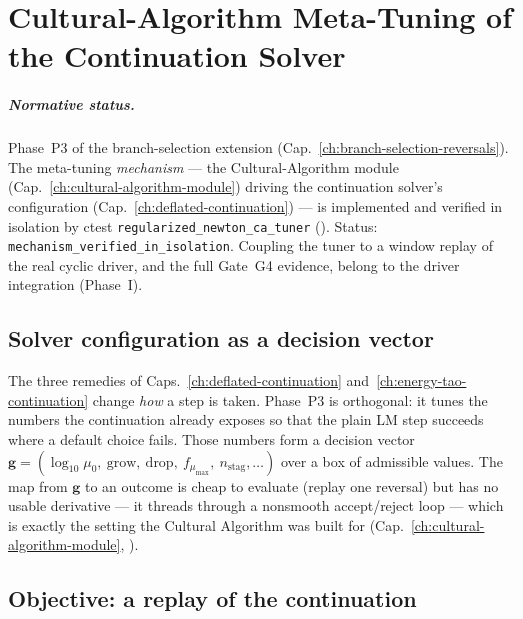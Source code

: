 
\chapter{Cultural-Algorithm Meta-Tuning of the Continuation Solver}
\label{ch:ca-tuner-solver}

\paragraph{Normative status.}
Phase~P3 of the branch-selection extension
(Cap.~\ref{ch:branch-selection-reversals}). The meta-tuning \emph{mechanism}
--- the Cultural-Algorithm module (Cap.~\ref{ch:cultural-algorithm-module})
driving the continuation solver's configuration
(Cap.~\ref{ch:deflated-continuation}) --- is implemented and verified in
isolation by ctest \texttt{regularized\_newton\_ca\_tuner}
(). Status:
\texttt{mechanism\_verified\_in\_isolation}. Coupling the tuner to a
window replay of the real cyclic driver, and the full Gate~G4 evidence,
belong to the driver integration (Phase~I).

\section{Solver configuration as a decision vector}

The three remedies of Caps.~\ref{ch:deflated-continuation}
and~\ref{ch:energy-tao-continuation} change \emph{how} a step is taken.
Phase~P3 is orthogonal: it tunes the numbers the continuation already
exposes so that the plain LM step succeeds where a default choice fails.
Those numbers form a decision vector
\(\mathbf{g}=(\log_{10}\mu_0,\ \text{grow},\ \text{drop},\
f_{\mu_{\max}},\ n_{\text{stag}},\dots)\)
over a box of admissible values. The map from \(\mathbf{g}\) to an
outcome is cheap to evaluate (replay one reversal) but has no usable
derivative --- it threads through a nonsmooth accept/reject loop --- which
is exactly the setting the Cultural Algorithm was built for
(Cap.~\ref{ch:cultural-algorithm-module}, \cite{Reynolds1994Cultural}).

\section{Objective: a replay of the continuation}

